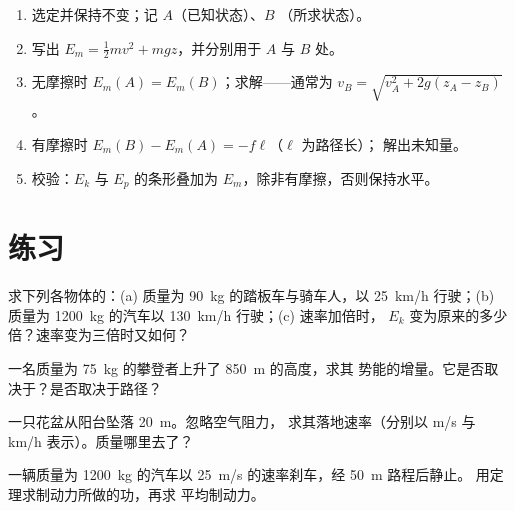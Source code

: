 \begin{method}[能量核算]\label{met:g11:mechanical-energy:bookkeeping}
\begin{enumerate}
  \item 选定并保持不变；记 $A$（已知状态）、$B$
        （所求状态）。
  \item 写出 $E_m = \tfrac12 mv^2 + mgz$，并分别用于 $A$ 与 $B$ 处。
  \item 无摩擦时 $E_m(A) = E_m(B)$；求解——通常为
        $v_B = \sqrt{v_A^2 + 2g(z_A - z_B)}$。
  \item 有摩擦时 $E_m(B) - E_m(A) = -f\ell$（$\ell$ 为路径长）；
        解出未知量。
  \item 校验：$E_k$ 与 $E_p$ 的条形叠加为 $E_m$，除非有摩擦，否则保持水平。
\end{enumerate}
\end{method}

\section{练习}

\begin{exercise}[$\star$]\label{exo:g11:mechanical-energy:1}
求下列各物体的：(a) 质量为 \qty{90}{kg} 的踏板车与骑车人，以
\qty{25}{km/h} 行驶；(b) 质量为 \qty{1200}{kg} 的汽车以 \qty{130}{km/h} 行驶；(c) 速率加倍时，
$E_k$ 变为原来的多少倍？速率变为三倍时又如何？
\end{exercise}

\begin{exercise}[$\star$]\label{exo:g11:mechanical-energy:2}
一名质量为 \qty{75}{kg} 的攀登者上升了 \qty{850}{m} 的高度，求其
势能的增量。它是否取决于？是否取决于路径？
\end{exercise}

\begin{exercise}[$\star$]\label{exo:g11:mechanical-energy:3}
一只花盆从阳台坠落 \qty{20}{m}。忽略空气阻力，
求其落地速率（分别以 \unit{m/s} 与 \unit{km/h} 表示）。质量哪里去了？
\end{exercise}

\begin{exercise}[$\star$]\label{exo:g11:mechanical-energy:4}
一辆质量为 \qty{1200}{kg} 的汽车以 \qty{25}{m/s} 的速率刹车，经 \qty{50}{m} 路程后静止。
用定理求制动力所做的功，再求
平均制动力。
\end{exercise}

